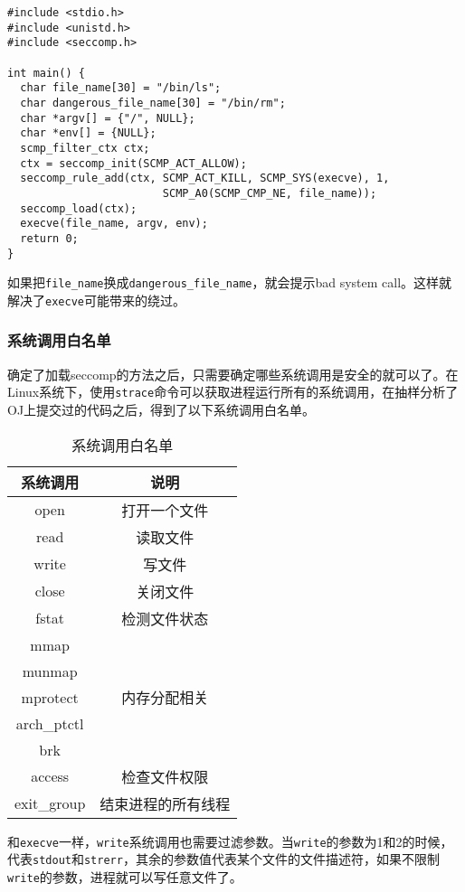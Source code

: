 \begin{verbatim}
#include <stdio.h>
#include <unistd.h>
#include <seccomp.h>
  
int main() {
  char file_name[30] = "/bin/ls";
  char dangerous_file_name[30] = "/bin/rm";
  char *argv[] = {"/", NULL};
  char *env[] = {NULL};
  scmp_filter_ctx ctx;
  ctx = seccomp_init(SCMP_ACT_ALLOW);
  seccomp_rule_add(ctx, SCMP_ACT_KILL, SCMP_SYS(execve), 1,
                        SCMP_A0(SCMP_CMP_NE, file_name));
  seccomp_load(ctx);
  execve(file_name, argv, env);
  return 0;
}
\end{verbatim}

如果把\texttt{file\_name}换成\texttt{dangerous\_file\_name}，就会提示bad system call。这样就解决了\texttt{execve}可能带来的绕过。

\subsubsection{系统调用白名单}

确定了加载seccomp的方法之后，只需要确定哪些系统调用是安全的就可以了。在Linux系统下，使用\texttt{strace}命令可以获取进程运行所有的系统调用，在抽样分析了OJ上提交过的代码之后，得到了以下系统调用白名单。
\begin{table}[H]
\centering
\caption{系统调用白名单}
\begin{tabular}{ |c|c| } 
\hline
系统调用 & 说明 \\
\hline
open &打开一个文件 \\
\hline
read &读取文件 \\
\hline
write &写文件 \\
\hline
close &关闭文件 \\
\hline
fstat &检测文件状态 \\
\hline
mmap &\multirow{5}{4em}{内存分配相关} \\ 
munmap& \\ 
mprotect& \\ 
arch\_ptctl& \\
brk& \\
\hline
access &检查文件权限 \\
\hline
exit\_group &结束进程的所有线程 \\
\hline
\end{tabular}
\end{table}
和\texttt{execve}一样，\texttt{write}系统调用也需要过滤参数。当\texttt{write}的参数为1和2的时候，代表\texttt{stdout}和\texttt{strerr}，其余的参数值代表某个文件的文件描述符，如果不限制\texttt{write}的参数，进程就可以写任意文件了。

